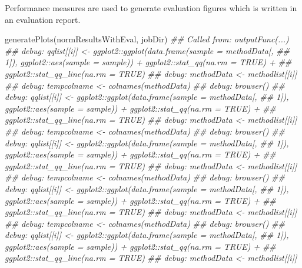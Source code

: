 \documentclass[]{article}
\newcommand{\hlcom}[1]{\textcolor[rgb]{0.502,0.502,0.502}{\textit{#1}}}%
\newcommand{\hlstd}[1]{\textcolor[rgb]{0.251,0.251,0.251}{#1}}%
\newenvironment{Shaded}{\begin{myshaded}}{\end{myshaded}}
\newcommand{\DocumentationTok}[1]{\hlcom{#1}}
\newcommand{\FunctionTok}[1]{\hlstd{#1}}
\newcommand{\NormalTok}[1]{\hlstd{#1}}
\begin{document}
Performance measures are used to generate evaluation figures which is written in an evaluation report.

\begin{Shaded}
\begin{Highlighting}[]
\FunctionTok{generatePlots}\NormalTok{(normResultsWithEval, jobDir)}
\DocumentationTok{\#\# Called from: outputFunc(...)}
\DocumentationTok{\#\# debug: qqlist[[i]] \textless{}{-} ggplot2::ggplot(data.frame(sample = methodData[, }
\DocumentationTok{\#\#     1]), ggplot2::aes(sample = sample)) + ggplot2::stat\_qq(na.rm = TRUE) + }
\DocumentationTok{\#\#     ggplot2::stat\_qq\_line(na.rm = TRUE)}
\DocumentationTok{\#\# debug: methodData \textless{}{-} methodlist[[i]]}
\DocumentationTok{\#\# debug: tempcolname \textless{}{-} colnames(methodData)}
\DocumentationTok{\#\# debug: browser()}
\DocumentationTok{\#\# debug: qqlist[[i]] \textless{}{-} ggplot2::ggplot(data.frame(sample = methodData[, }
\DocumentationTok{\#\#     1]), ggplot2::aes(sample = sample)) + ggplot2::stat\_qq(na.rm = TRUE) + }
\DocumentationTok{\#\#     ggplot2::stat\_qq\_line(na.rm = TRUE)}
\DocumentationTok{\#\# debug: methodData \textless{}{-} methodlist[[i]]}
\DocumentationTok{\#\# debug: tempcolname \textless{}{-} colnames(methodData)}
\DocumentationTok{\#\# debug: browser()}
\DocumentationTok{\#\# debug: qqlist[[i]] \textless{}{-} ggplot2::ggplot(data.frame(sample = methodData[, }
\DocumentationTok{\#\#     1]), ggplot2::aes(sample = sample)) + ggplot2::stat\_qq(na.rm = TRUE) + }
\DocumentationTok{\#\#     ggplot2::stat\_qq\_line(na.rm = TRUE)}
\DocumentationTok{\#\# debug: methodData \textless{}{-} methodlist[[i]]}
\DocumentationTok{\#\# debug: tempcolname \textless{}{-} colnames(methodData)}
\DocumentationTok{\#\# debug: browser()}
\DocumentationTok{\#\# debug: qqlist[[i]] \textless{}{-} ggplot2::ggplot(data.frame(sample = methodData[, }
\DocumentationTok{\#\#     1]), ggplot2::aes(sample = sample)) + ggplot2::stat\_qq(na.rm = TRUE) + }
\DocumentationTok{\#\#     ggplot2::stat\_qq\_line(na.rm = TRUE)}
\DocumentationTok{\#\# debug: methodData \textless{}{-} methodlist[[i]]}
\DocumentationTok{\#\# debug: tempcolname \textless{}{-} colnames(methodData)}
\DocumentationTok{\#\# debug: browser()}
\DocumentationTok{\#\# debug: qqlist[[i]] \textless{}{-} ggplot2::ggplot(data.frame(sample = methodData[, }
\DocumentationTok{\#\#     1]), ggplot2::aes(sample = sample)) + ggplot2::stat\_qq(na.rm = TRUE) + }
\DocumentationTok{\#\#     ggplot2::stat\_qq\_line(na.rm = TRUE)}
\DocumentationTok{\#\# debug: methodData \textless{}{-} methodlist[[i]]}

\end{Highlighting}
\end{Shaded}
\end{document}
